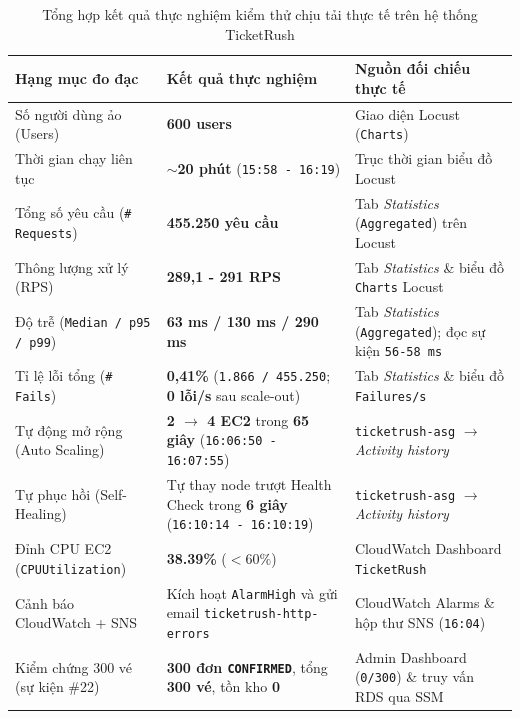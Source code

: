 \begin{table}[H]
  \centering
  \small
  \renewcommand{\arraystretch}{1.24}
  \begin{tabularx}{\textwidth}{>{\raggedright\arraybackslash}p{5.1cm} >{\raggedright\arraybackslash}p{4.6cm} >{\raggedright\arraybackslash}X}
    \toprule
    \textbf{Hạng mục đo đạc} & \textbf{Kết quả thực nghiệm} & \textbf{Nguồn đối chiếu thực tế} \\
    \midrule
    Số người dùng ảo (Users) & \textbf{600 users} & Giao diện Locust (\texttt{Charts}) \\
    Thời gian chạy liên tục & \textbf{$\sim$20 phút} (\texttt{15:58 - 16:19}) & Trục thời gian biểu đồ Locust \\
    Tổng số yêu cầu (\texttt{\# Requests}) & \textbf{455.250 yêu cầu} & Tab \textit{Statistics} (\texttt{Aggregated}) trên Locust \\
    Thông lượng xử lý (RPS) & \textbf{289,1 - 291 RPS} & Tab \textit{Statistics} \& biểu đồ \texttt{Charts} Locust \\
    Độ trễ (\texttt{Median / p95 / p99}) & \textbf{63 ms / 130 ms / 290 ms} & Tab \textit{Statistics} (\texttt{Aggregated}); đọc sự kiện \texttt{56-58 ms} \\
    Tỉ lệ lỗi tổng (\texttt{\# Fails}) & \textbf{0,41\%} (\texttt{1.866 / 455.250}; \textbf{0 lỗi/s} sau scale-out) & Tab \textit{Statistics} \& biểu đồ \texttt{Failures/s} \\
    Tự động mở rộng (Auto Scaling) & \textbf{2 $\rightarrow$ 4 EC2} trong \textbf{65 giây} (\texttt{16:06:50 - 16:07:55}) & \texttt{ticketrush-asg} $\rightarrow$ \textit{Activity history} \\
    Tự phục hồi (Self-Healing) & Tự thay node trượt Health Check trong \textbf{6 giây} (\texttt{16:10:14 - 16:10:19}) & \texttt{ticketrush-asg} $\rightarrow$ \textit{Activity history} \\
    Đỉnh CPU EC2 (\texttt{CPUUtilization}) & \textbf{38.39\%} ($< 60\%$) & CloudWatch Dashboard \texttt{TicketRush} \\
    Cảnh báo CloudWatch + SNS & Kích hoạt \texttt{AlarmHigh} và gửi email \texttt{ticketrush-http-errors} & CloudWatch Alarms \& hộp thư SNS (\texttt{16:04}) \\
    Kiểm chứng 300 vé (sự kiện \#22) & \textbf{300 đơn \texttt{CONFIRMED}}, tổng \textbf{300 vé}, tồn kho \textbf{0} & Admin Dashboard (\texttt{0/300}) \& truy vấn RDS qua SSM \\
    \bottomrule
  \end{tabularx}
  \caption{Tổng hợp kết quả thực nghiệm kiểm thử chịu tải thực tế trên hệ thống TicketRush}
  \label{tab:loadtest-results}
\end{table}

